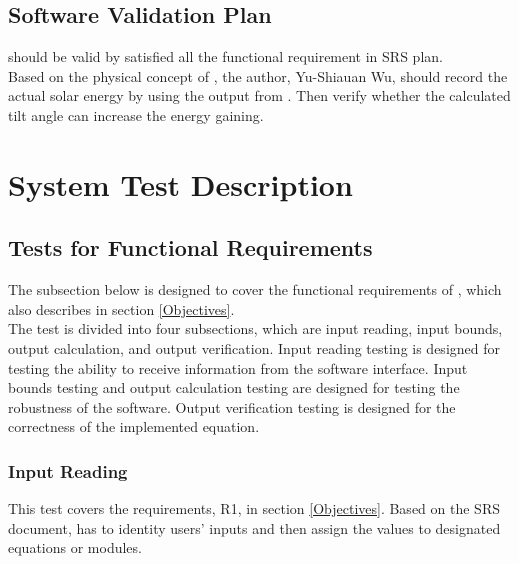 \documentclass[12pt, titlepage]{article}
\begin{document}
\subsection{Software Validation Plan}

\progname should be valid by satisfied all the functional requirement in SRS 
plan.\\
Based on the physical concept of \progname, the author, Yu-Shiauan Wu, should
record the actual solar energy by using the output from \progname. Then verify
whether the calculated tilt angle can increase the energy gaining.


\section{System Test Description}\label{STD}	
\subsection{Tests for Functional Requirements}

The subsection below is designed to cover the functional requirements of
\progname, which also describes in section \ref{Objectives}.\\
The test is divided into four subsections, which are input reading, input
bounds,
output calculation, and output verification. Input reading testing is designed
for
testing the ability to receive information from the software interface. Input
bounds
testing and output calculation testing are designed for testing the robustness
of the
software. Output verification testing is designed for the correctness of the 
implemented equation.

 

\subsubsection{Input Reading}

This test covers the requirements, R1, in section \ref{Objectives}. Based on
the SRS document\cite{YS2019}, \progname has to identity users' inputs and
then assign the values to designated equations or modules.
\end{document}
